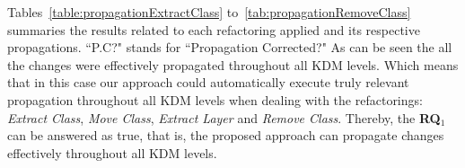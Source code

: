 
Tables~\ref{table:propagationExtractClass} to~\ref{tab:propagationRemoveClass} summaries the results related to each refactoring applied and its respective propagations. ``P.C?" stands for ``Propagation Corrected?" As can be seen the all the changes were effectively propagated throughout all KDM levels. Which means that in this case our approach could automatically execute truly relevant propagation throughout all KDM levels when dealing with the refactorings: \textit{Extract Class}, \textit{Move Class}, \textit{Extract Layer} and \textit{Remove Class}. Thereby, the \textbf{RQ$_1$} can be answered as true, that is, the proposed approach can propagate changes effectively throughout all KDM levels.